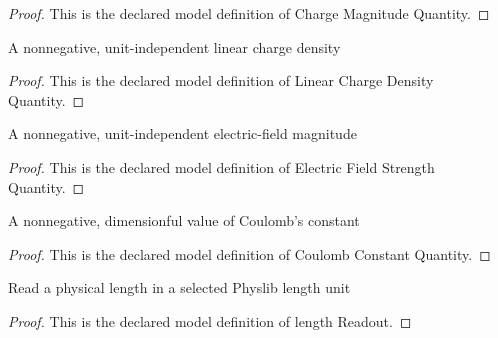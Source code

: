 \begin{proof}
  This is the declared model definition of Charge Magnitude Quantity.
\end{proof}
\begin{definition}
  \label{def:physics:phyx-mini-0835:phyxminiproblems-problemphyxmini0835-linearchargedensityquantity}
  A nonnegative, unit-independent linear charge density
\end{definition}
\begin{proof}
  This is the declared model definition of Linear Charge Density Quantity.
\end{proof}
\begin{definition}
  \label{def:physics:phyx-mini-0835:phyxminiproblems-problemphyxmini0835-electricfieldstrengthquantity}
  A nonnegative, unit-independent electric-field magnitude
\end{definition}
\begin{proof}
  This is the declared model definition of Electric Field Strength Quantity.
\end{proof}
\begin{definition}
  \label{def:physics:phyx-mini-0835:phyxminiproblems-problemphyxmini0835-coulombconstantquantity}
  A nonnegative, dimensionful value of Coulomb's constant
\end{definition}
\begin{proof}
  This is the declared model definition of Coulomb Constant Quantity.
\end{proof}
\begin{definition}
  \label{def:physics:phyx-mini-0835:phyxminiproblems-problemphyxmini0835-lengthreadout}
  Read a physical length in a selected Physlib length unit
\end{definition}
\begin{proof}
  This is the declared model definition of length Readout.
\end{proof}
